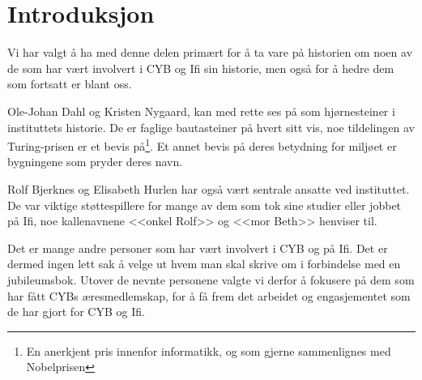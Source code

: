 \chapter*{Introduksjon}

\setcounter{footnote}{0}

Vi har valgt å ha med denne delen primært for å ta vare på historien om noen av de som har vært involvert i CYB og Ifi sin historie, men også for å hedre dem som fortsatt er blant oss.

Ole-Johan Dahl og Kristen Nygaard, kan med rette ses på som hjørnesteiner i instituttets historie. De er faglige bautasteiner på hvert sitt vis, noe tildelingen av Turing-prisen er et bevis på\footnote{En anerkjent pris innenfor informatikk, og som gjerne sammenlignes med Nobelprisen}. Et annet bevis på deres betydning for miljøet er bygningene som pryder deres navn.

Rolf Bjerknes og Elisabeth Hurlen har også vært sentrale ansatte ved instituttet. De var viktige støttespillere for mange av dem som tok sine studier eller jobbet på Ifi, noe kallenavnene <<onkel Rolf>> og <<mor Beth>> henviser til.

Det er mange andre personer som har vært involvert i CYB og på Ifi. Det er dermed ingen lett sak å velge ut hvem man skal skrive om i forbindelse med en jubileumsbok. Utover de nevnte personene valgte vi derfor å fokusere på dem som har fått CYBs æresmedlemskap, for å få frem det arbeidet og engasjementet som de har gjort for CYB og Ifi.
